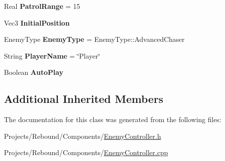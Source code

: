 \begin{DoxyCompactItemize}
\item 
\hypertarget{classDCEngine_1_1Components_1_1EnemyController_a260119971750eb799315088a61a0cd8c}{Real {\bfseries Patrol\-Range} = 15}\label{classDCEngine_1_1Components_1_1EnemyController_a260119971750eb799315088a61a0cd8c}

\item 
\hypertarget{classDCEngine_1_1Components_1_1EnemyController_ad68c94984e02d3c379ccaa5d18d2d25e}{Vec3 {\bfseries Initial\-Position}}\label{classDCEngine_1_1Components_1_1EnemyController_ad68c94984e02d3c379ccaa5d18d2d25e}

\item 
\hypertarget{classDCEngine_1_1Components_1_1EnemyController_acf601603654b1bebbf07df0719b527eb}{Enemy\-Type {\bfseries Enemy\-Type} = Enemy\-Type\-::\-Advanced\-Chaser}\label{classDCEngine_1_1Components_1_1EnemyController_acf601603654b1bebbf07df0719b527eb}

\item 
\hypertarget{classDCEngine_1_1Components_1_1EnemyController_a1c386fe211166ca7394a7d1a2bd2c2e0}{String {\bfseries Player\-Name} = \char`\"{}Player\char`\"{}}\label{classDCEngine_1_1Components_1_1EnemyController_a1c386fe211166ca7394a7d1a2bd2c2e0}

\item 
\hypertarget{classDCEngine_1_1Components_1_1EnemyController_a35b20b55bd7a03e498b24c9b3f99c173}{Boolean {\bfseries Auto\-Play}}\label{classDCEngine_1_1Components_1_1EnemyController_a35b20b55bd7a03e498b24c9b3f99c173}

\end{DoxyCompactItemize}
\subsection*{Additional Inherited Members}


The documentation for this class was generated from the following files\-:\begin{DoxyCompactItemize}
\item 
Projects/\-Rebound/\-Components/\hyperlink{EnemyController_8h}{Enemy\-Controller.\-h}\item 
Projects/\-Rebound/\-Components/\hyperlink{EnemyController_8cpp}{Enemy\-Controller.\-cpp}\end{DoxyCompactItemize}
